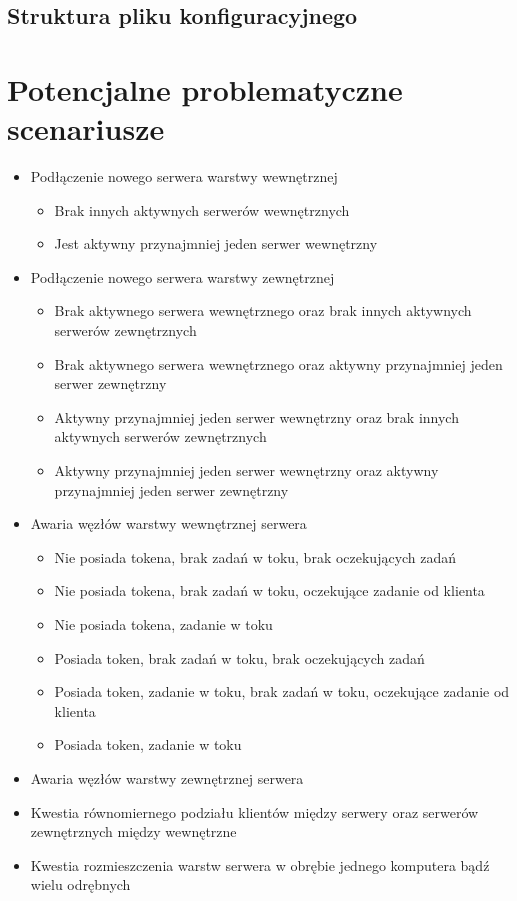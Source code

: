 \subsection[Struktura pliku konfiguracyjnego]{Struktura pliku konfiguracyjnego}


\section[Potencjalne problematyczne scenariusze]{Potencjalne problematyczne scenariusze}

\begin{itemize}
\item Podłączenie nowego serwera warstwy wewnętrznej
\begin{itemize}
\item Brak innych aktywnych serwerów wewnętrznych
\item Jest aktywny przynajmniej jeden serwer wewnętrzny
\end{itemize}
\item Podłączenie nowego serwera warstwy zewnętrznej
\begin{itemize}
\item Brak aktywnego serwera wewnętrznego oraz brak innych aktywnych serwerów zewnętrznych
\item Brak aktywnego serwera wewnętrznego oraz aktywny przynajmniej jeden serwer zewnętrzny
\item Aktywny przynajmniej jeden serwer wewnętrzny oraz brak innych aktywnych serwerów zewnętrznych
\item Aktywny przynajmniej jeden serwer wewnętrzny oraz aktywny przynajmniej jeden serwer zewnętrzny
\end{itemize}
\item Awaria węzłów warstwy wewnętrznej serwera
\begin{itemize}
\item Nie posiada tokena, brak zadań w toku, brak oczekujących zadań
\item Nie posiada tokena, brak zadań w toku, oczekujące zadanie od klienta
\item Nie posiada tokena, zadanie w toku
\item Posiada token, brak zadań w toku, brak oczekujących zadań
\item Posiada token, zadanie w toku, brak zadań w toku, oczekujące zadanie od klienta
\item Posiada token, zadanie w toku
\end{itemize}
\item Awaria węzłów warstwy zewnętrznej serwera
\item Kwestia równomiernego podziału klientów między serwery oraz serwerów zewnętrznych między wewnętrzne
\item Kwestia rozmieszczenia warstw serwera w obrębie jednego komputera bądź wielu odrębnych
\end{itemize}

